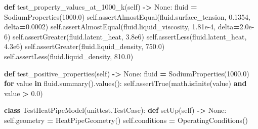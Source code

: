 \documentclass[
  12pt,a4paper,oneside]{report}
\newenvironment{Shaded}{\begin{snugshade}}{\end{snugshade}}
\newcommand{\ControlFlowTok}[1]{\textcolor[rgb]{0.13,0.29,0.53}{\textbf{#1}}}
\newcommand{\FloatTok}[1]{\textcolor[rgb]{0.00,0.00,0.81}{#1}}
\newcommand{\KeywordTok}[1]{\textcolor[rgb]{0.13,0.29,0.53}{\textbf{#1}}}
\newcommand{\NormalTok}[1]{#1}
\newcommand{\OperatorTok}[1]{\textcolor[rgb]{0.81,0.36,0.00}{\textbf{#1}}}
\newcommand{\VariableTok}[1]{\textcolor[rgb]{0.00,0.00,0.00}{#1}}
\begin{document}
\begin{Shaded}
\begin{Highlighting}[]
    \KeywordTok{def}\NormalTok{ test\_property\_values\_at\_1000\_k(}\VariableTok{self}\NormalTok{) }\OperatorTok{{-}\textgreater{}} \VariableTok{None}\NormalTok{:}
\NormalTok{        fluid }\OperatorTok{=}\NormalTok{ SodiumProperties(}\FloatTok{1000.0}\NormalTok{)}
        \VariableTok{self}\NormalTok{.assertAlmostEqual(fluid.surface\_tension, }\FloatTok{0.1354}\NormalTok{, delta}\OperatorTok{=}\FloatTok{0.0002}\NormalTok{)}
        \VariableTok{self}\NormalTok{.assertAlmostEqual(fluid.liquid\_viscosity, }\FloatTok{1.81e{-}4}\NormalTok{, delta}\OperatorTok{=}\FloatTok{2.0e{-}6}\NormalTok{)}
        \VariableTok{self}\NormalTok{.assertGreater(fluid.latent\_heat, }\FloatTok{3.8e6}\NormalTok{)}
        \VariableTok{self}\NormalTok{.assertLess(fluid.latent\_heat, }\FloatTok{4.3e6}\NormalTok{)}
        \VariableTok{self}\NormalTok{.assertGreater(fluid.liquid\_density, }\FloatTok{750.0}\NormalTok{)}
        \VariableTok{self}\NormalTok{.assertLess(fluid.liquid\_density, }\FloatTok{810.0}\NormalTok{)}

    \KeywordTok{def}\NormalTok{ test\_positive\_properties(}\VariableTok{self}\NormalTok{) }\OperatorTok{{-}\textgreater{}} \VariableTok{None}\NormalTok{:}
\NormalTok{        fluid }\OperatorTok{=}\NormalTok{ SodiumProperties(}\FloatTok{1000.0}\NormalTok{)}
        \ControlFlowTok{for}\NormalTok{ value }\KeywordTok{in}\NormalTok{ fluid.summary().values():}
            \VariableTok{self}\NormalTok{.assertTrue(math.isfinite(value) }\KeywordTok{and}\NormalTok{ value }\OperatorTok{\textgreater{}} \FloatTok{0.0}\NormalTok{)}


\KeywordTok{class}\NormalTok{ TestHeatPipeModel(unittest.TestCase):}
    \KeywordTok{def}\NormalTok{ setUp(}\VariableTok{self}\NormalTok{) }\OperatorTok{{-}\textgreater{}} \VariableTok{None}\NormalTok{:}
        \VariableTok{self}\NormalTok{.geometry }\OperatorTok{=}\NormalTok{ HeatPipeGeometry()}
        \VariableTok{self}\NormalTok{.conditions }\OperatorTok{=}\NormalTok{ OperatingConditions()}


\end{Highlighting}
\end{Shaded}
\end{document}
